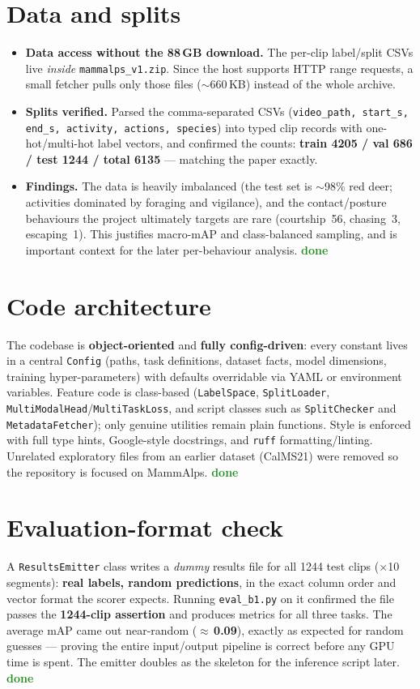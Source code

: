\documentclass[11pt,a4paper]{article}
\newcommand{\done}{\textcolor{ForestGreen}{\textbf{done}}}
\begin{document}
\section{Data and splits}
\begin{itemize}
  \item \textbf{Data access without the 88\,GB download.} The per-clip label/split CSVs live
        \emph{inside} \texttt{mammalps\_v1.zip}. Since the host supports HTTP range requests,
        a small fetcher pulls only those files ($\sim$660\,KB) instead of the whole archive.
  \item \textbf{Splits verified.} Parsed the comma-separated CSVs
        (\texttt{video\_path, start\_s, end\_s, activity, actions, species}) into typed clip
        records with one-hot/multi-hot label vectors, and confirmed the counts:
        \textbf{train 4205 / val 686 / test 1244 / total 6135} --- matching the paper exactly.
  \item \textbf{Findings.} The data is heavily imbalanced (the test set is $\sim$98\%
        red deer; activities dominated by foraging and vigilance), and the contact/posture
        behaviours the project ultimately targets are rare (courtship~56, chasing~3,
        escaping~1). This justifies macro-mAP and class-balanced sampling, and is important
        context for the later per-behaviour analysis. \done
\end{itemize}

\section{Code architecture}
The codebase is \textbf{object-oriented} and \textbf{fully config-driven}: every constant
lives in a central \texttt{Config} (paths, task definitions, dataset facts, model dimensions,
training hyper-parameters) with defaults overridable via YAML or environment variables.
Feature code is class-based (\texttt{LabelSpace}, \texttt{SplitLoader},
\texttt{MultiModalHead}/\texttt{MultiTaskLoss}, and script classes such as
\texttt{SplitChecker} and \texttt{MetadataFetcher}); only genuine utilities remain plain
functions. Style is enforced with full type hints, Google-style docstrings, and \texttt{ruff}
formatting/linting. Unrelated exploratory files from an earlier dataset (CalMS21) were removed
so the repository is focused on MammAlps. \done

\section{Evaluation-format check}
A \texttt{ResultsEmitter} class writes a \emph{dummy} results file for all 1244 test clips
($\times$10 segments): \textbf{real labels, random predictions}, in the exact column order and
vector format the scorer expects. Running \texttt{eval\_b1.py} on it confirmed the file passes
the \textbf{1244-clip assertion} and produces metrics for all three tasks. The average mAP came
out near-random ($\approx$\,\textbf{0.09}), exactly as expected for random guesses --- proving
the entire input/output pipeline is correct before any GPU time is spent. The emitter doubles
as the skeleton for the inference script later. \done
\end{document}
